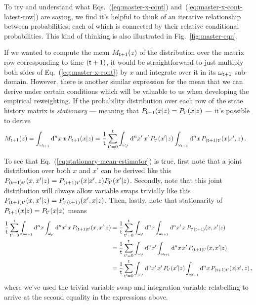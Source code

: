 To try and understand what Eqs.~(\ref{eq:master-x-cont}) and~(\ref{eq:master-x-cont-latest-row}) are saying, we find it's helpful to think of an iterative relationship between probabilities; each of which is connected by their relative conditional probabilities. This kind of thinking is also illustrated in Fig.~\ref{fig:master-eqn}.

If we wanted to compute the mean $M_{{\sf t}+1}(z)$ of the distribution over the matrix row corresponding to time $({\sf t}+1)$, it would be straightforward to just multiply both sides of Eq.~(\ref{eq:master-x-cont}) by $x$ and integrate over it in its $\omega_{{\sf t}+1}$ sub-domain. However, there is another similar expression for the mean that we can derive under certain conditions which will be valuable to us when developing the empirical reweighting. If the probability distribution over each row of the state history matrix is \emph{stationary} --- meaning that $P_{{\sf t}+1}(x\vert z)=P_{{\sf t}'}(x\vert z)$ --- it's possible to derive
\begin{align}
M_{{\sf t}+1}(z) &= \int_{\omega_{{\sf t}+1}}{\rm d}^nx \,x\,P_{{\sf t}+1}(x\vert z) = \frac{1}{{\sf t}}\sum_{{\sf t}'=0}^{{\sf t}}\int_{\omega_{{\sf t}'}}{\rm d}^nx' \,x'\, P_{{\sf t}'}(x'\vert z) \int_{\omega_{{\sf t}+1}}{\rm d}^nx\, P_{({\sf t}+1){\sf t}'}(x\vert x',z) \label{eq:stationary-mean-estimator}\,.
\end{align}

To see that Eq.~(\ref{eq:stationary-mean-estimator}) is true, first note that a joint distribution over both $x$ and $x'$ can be derived like this $P_{({\sf t}+1){\sf t}'}(x,x'\vert z)=P_{({\sf t}+1){\sf t}'}(x\vert x',z)P_{{\sf t}'}(x'\vert z)$. Secondly, note that this joint distribution will always allow variable swaps trivially like this $P_{({\sf t}+1){\sf t}'}(x,x'\vert z)=P_{{\sf t}'({\sf t}+1)}(x',x\vert z)$. Then, lastly, note that stationarity of $P_{{\sf t}+1}(x\vert z)=P_{{\sf t}'}(x\vert z)$ means 
\begin{align}
\frac{1}{{\sf t}}\sum_{{\sf t}'=0}^{{\sf t}}\int_{\omega_{{\sf t}+1}} {\rm d}^nx\int_{\omega_{{\sf t}'}} {\rm d}^nx' \,x\, P_{({\sf t}+1){\sf t}'}(x,x'\vert z)&=\frac{1}{{\sf t}}\sum_{{\sf t}'=0}^{{\sf t}}\int_{\omega_{{\sf t}'}} {\rm d}^nx\int_{\omega_{{\sf t}+1}} {\rm d}^nx' \,x\, P_{{\sf t}'({\sf t}+1)}(x,x'\vert z)\nonumber \\
&=\frac{1}{{\sf t}}\sum_{{\sf t}'=0}^{{\sf t}}\int_{\omega_{{\sf t}'}} {\rm d}^nx'\int_{\omega_{{\sf t}+1}} {\rm d}^nx \,x'\, P_{({\sf t}+1){\sf t}'}(x,x'\vert z) \nonumber \\
&=\frac{1}{{\sf t}}\sum_{{\sf t}'=0}^{{\sf t}}\int_{\omega_{{\sf t}'}}{\rm d}^nx' \,x'\, P_{{\sf t}'}(x'\vert z) \int_{\omega_{{\sf t}+1}}{\rm d}^nx\, P_{({\sf t}+1){\sf t}'}(x\vert x',z)\nonumber \,,
\end{align}
where we've used the trivial variable swap and integration variable relabelling to arrive at the second equality in the expressions above. 

